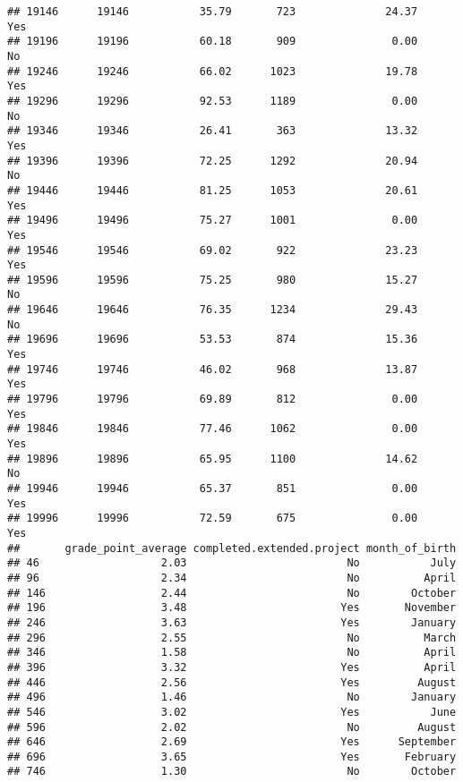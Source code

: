 \documentclass[
]{article}
\begin{document}
\begin{verbatim}
## 19146      19146           35.79       723              24.37               Yes
## 19196      19196           60.18       909               0.00                No
## 19246      19246           66.02      1023              19.78               Yes
## 19296      19296           92.53      1189               0.00                No
## 19346      19346           26.41       363              13.32               Yes
## 19396      19396           72.25      1292              20.94                No
## 19446      19446           81.25      1053              20.61               Yes
## 19496      19496           75.27      1001               0.00               Yes
## 19546      19546           69.02       922              23.23               Yes
## 19596      19596           75.25       980              15.27                No
## 19646      19646           76.35      1234              29.43                No
## 19696      19696           53.53       874              15.36               Yes
## 19746      19746           46.02       968              13.87               Yes
## 19796      19796           69.89       812               0.00               Yes
## 19846      19846           77.46      1062               0.00               Yes
## 19896      19896           65.95      1100              14.62                No
## 19946      19946           65.37       851               0.00               Yes
## 19996      19996           72.59       675               0.00               Yes
##       grade_point_average completed.extended.project month_of_birth
## 46                   2.03                         No           July
## 96                   2.34                         No          April
## 146                  2.44                         No        October
## 196                  3.48                        Yes       November
## 246                  3.63                        Yes        January
## 296                  2.55                         No          March
## 346                  1.58                         No          April
## 396                  3.32                        Yes          April
## 446                  2.56                        Yes         August
## 496                  1.46                         No        January
## 546                  3.02                        Yes           June
## 596                  2.02                         No         August
## 646                  2.69                        Yes      September
## 696                  3.65                        Yes       February
## 746                  1.30                         No        October

\end{verbatim}
\end{document}
